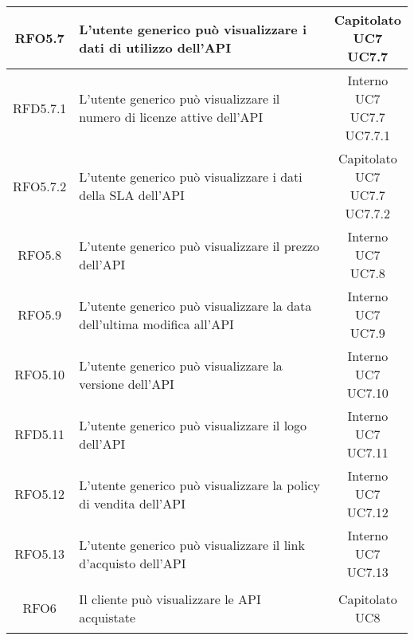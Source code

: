 \begin{longtable}{|c|p{8cm}|c|}
\hypertarget{RFO5.7}{RFO5.7} & L'utente generico può visualizzare i dati di utilizzo dell'API & \makecell*{Capitolato\\UC7\\UC7.7} \\
\hline
\hypertarget{RFD5.7.1}{RFD5.7.1} & L'utente generico può visualizzare il numero di licenze attive dell'API & \makecell*{Interno\\UC7\\UC7.7\\UC7.7.1} \\
\hline
\hypertarget{RFO5.7.2}{RFO5.7.2} & L'utente generico può visualizzare i dati della SLA dell'API & \makecell*{Capitolato\\UC7\\UC7.7\\UC7.7.2} \\
\hline

\hypertarget{RFO5.8}{RFO5.8} & L'utente generico può visualizzare il prezzo dell'API & \makecell*{Interno\\UC7\\UC7.8} \\
\hline
\hypertarget{RFO5.9}{RFO5.9} & L'utente generico può visualizzare la data dell'ultima modifica all'API & \makecell*{Interno\\UC7\\UC7.9} \\
\hline
\hypertarget{RFO5.10}{RFO5.10} & L'utente generico può visualizzare la versione dell'API & \makecell*{Interno\\UC7\\UC7.10} \\
\hline
\hypertarget{RFD5.11}{RFD5.11} & L'utente generico può visualizzare il logo dell'API & \makecell*{Interno\\UC7\\UC7.11} \\
\hline
\hypertarget{RFO5.12}{RFO5.12} & L'utente generico può visualizzare la policy di vendita dell'API & \makecell*{Interno\\UC7\\UC7.12} \\
\hline
\hypertarget{RFO5.13}{RFO5.13} & L'utente generico può visualizzare il link d'acquisto dell'API & \makecell*{Interno\\UC7\\UC7.13} \\
\hline

\hypertarget{RFO6}{RFO6} & Il cliente può visualizzare le API acquistate & \makecell*{Capitolato\\UC8} \\
\hline


\end{longtable}
